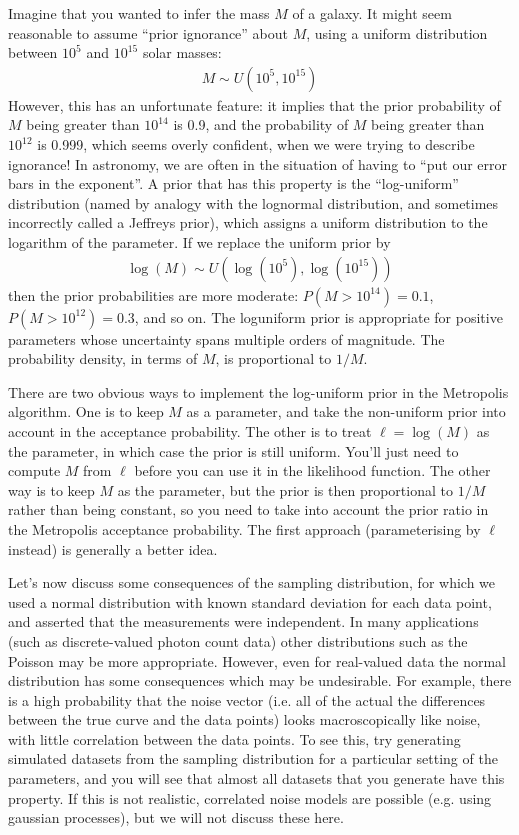 Imagine that you wanted to infer the mass
$M$ of a galaxy. It might seem reasonable to assume ``prior ignorance''
about $M$, using a uniform distribution
between $10^{5}$ and $10^{15}$ solar masses:
\begin{eqnarray}
M \sim U(10^{5}, 10^{15})
\end{eqnarray}
However, this has an unfortunate feature: it implies that the prior probability
of $M$ being greater than $10^{14}$ is 0.9, and the probability of $M$ being
greater than $10^{12}$ is 0.999, which seems overly confident, when we were
trying to describe ignorance! In astronomy,
we are often in the situation of having to ``put our error bars in the
exponent''. A prior that has this property is the ``log-uniform'' distribution
(named by analogy with the lognormal distribution, and sometimes incorrectly
called a Jeffreys prior), which assigns a uniform distribution to the logarithm
of the parameter. If we replace the uniform prior by
\begin{eqnarray}
\log(M) \sim U(\log(10^{5}), \log(10^{15}))
\end{eqnarray}
then the prior probabilities are more moderate: $P(M > 10^{14}) = 0.1$,
$P(M > 10^{12}) = 0.3$, and so on. The loguniform prior is appropriate for
positive parameters whose uncertainty spans multiple orders of magnitude.
The probability density, in terms of $M$, is proportional to $1/M$.

There are two obvious ways to implement the log-uniform prior in the Metropolis
algorithm. One is to keep $M$ as a parameter, and take the non-uniform prior
into account in the acceptance probability. The other is to treat
$\ell = \log(M)$ as the parameter, in which case the prior is still uniform.
You'll just need to compute $M$ from $\ell$ before you can use it in the
likelihood function. The other way is to keep $M$ as the parameter, but the
prior is then proportional to $1/M$ rather than being constant, so you need
to take into account the prior ratio in the Metropolis acceptance probability.
The first approach (parameterising by $\ell$ instead) is generally a better
idea.

Let's now discuss some consequences of the sampling distribution, for which we
used a normal distribution with known standard deviation for each data point,
and asserted that the measurements were independent. In many applications
(such as discrete-valued photon count data) other distributions such as the
Poisson may be more appropriate. However, even for real-valued data the
normal distribution has some consequences which may be undesirable.
For example, there is a high probability that the noise vector (i.e. all of the actual
the differences between the true curve and the data points) looks
macroscopically like noise, with little correlation between the data points.
To see this, try generating simulated datasets from the sampling distribution
for a particular setting of the parameters, and you will see that almost all
datasets that you generate have this property. If this is not realistic,
correlated noise models are possible (e.g. using gaussian processes), but we
will not discuss these here.

